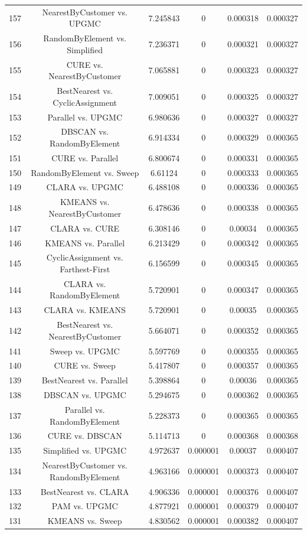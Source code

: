 \documentclass[a4paper,10pt]{article}
\begin{document}
\begin{landscape}
\begin{table}[!htp]
\begin{tabular}{cccccc}
157&NearestByCustomer vs. UPGMC&7.245843&0&0.000318&0.000327\\
156&RandomByElement vs. Simplified&7.236371&0&0.000321&0.000327\\
155&CURE vs. NearestByCustomer&7.065881&0&0.000323&0.000327\\
154&BestNearest vs. CyclicAssignment&7.009051&0&0.000325&0.000327\\
153&Parallel vs. UPGMC&6.980636&0&0.000327&0.000327\\
152&DBSCAN vs. RandomByElement&6.914334&0&0.000329&0.000365\\
151&CURE vs. Parallel&6.800674&0&0.000331&0.000365\\
150&RandomByElement vs. Sweep&6.61124&0&0.000333&0.000365\\
149&CLARA vs. UPGMC&6.488108&0&0.000336&0.000365\\
148&KMEANS vs. NearestByCustomer&6.478636&0&0.000338&0.000365\\
147&CLARA vs. CURE&6.308146&0&0.00034&0.000365\\
146&KMEANS vs. Parallel&6.213429&0&0.000342&0.000365\\
145&CyclicAssignment vs. Farthest-First&6.156599&0&0.000345&0.000365\\
144&CLARA vs. RandomByElement&5.720901&0&0.000347&0.000365\\
143&CLARA vs. KMEANS&5.720901&0&0.00035&0.000365\\
142&BestNearest vs. NearestByCustomer&5.664071&0&0.000352&0.000365\\
141&Sweep vs. UPGMC&5.597769&0&0.000355&0.000365\\
140&CURE vs. Sweep&5.417807&0&0.000357&0.000365\\
139&BestNearest vs. Parallel&5.398864&0&0.00036&0.000365\\
138&DBSCAN vs. UPGMC&5.294675&0&0.000362&0.000365\\
137&Parallel vs. RandomByElement&5.228373&0&0.000365&0.000365\\
136&CURE vs. DBSCAN&5.114713&0&0.000368&0.000368\\
135&Simplified vs. UPGMC&4.972637&0.000001&0.00037&0.000407\\
134&NearestByCustomer vs. RandomByElement&4.963166&0.000001&0.000373&0.000407\\
133&BestNearest vs. CLARA&4.906336&0.000001&0.000376&0.000407\\
132&PAM vs. UPGMC&4.877921&0.000001&0.000379&0.000407\\
131&KMEANS vs. Sweep&4.830562&0.000001&0.000382&0.000407\\

\end{tabular}
\end{table}
\end{landscape}
\end{document}
